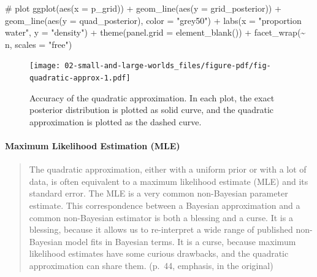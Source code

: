 \documentclass[
  letterpaper,
  DIV=11,
  numbers=noendperiod]{scrreprt}
\let\oldparagraph\paragraph
\renewcommand{\paragraph}[1]{\oldparagraph{#1}\mbox{}}
\newenvironment{Shaded}{\begin{snugshade}}{\end{snugshade}}
\newcommand{\AttributeTok}[1]{\textcolor[rgb]{0.40,0.45,0.13}{#1}}
\newcommand{\CommentTok}[1]{\textcolor[rgb]{0.37,0.37,0.37}{#1}}
\newcommand{\FunctionTok}[1]{\textcolor[rgb]{0.28,0.35,0.67}{#1}}
\newcommand{\InformationTok}[1]{\textcolor[rgb]{0.37,0.37,0.37}{#1}}
\newcommand{\NormalTok}[1]{\textcolor[rgb]{0.00,0.23,0.31}{#1}}
\newcommand{\SpecialCharTok}[1]{\textcolor[rgb]{0.37,0.37,0.37}{#1}}
\newcommand{\StringTok}[1]{\textcolor[rgb]{0.13,0.47,0.30}{#1}}
\begin{document}
\begin{codelisting}
\begin{Shaded}
\begin{Highlighting}[]
  \CommentTok{\# plot}
  \FunctionTok{ggplot}\NormalTok{(}\FunctionTok{aes}\NormalTok{(}\AttributeTok{x =}\NormalTok{ p\_grid)) }\SpecialCharTok{+}
  \FunctionTok{geom\_line}\NormalTok{(}\FunctionTok{aes}\NormalTok{(}\AttributeTok{y =}\NormalTok{ grid\_posterior)) }\SpecialCharTok{+}
  \FunctionTok{geom\_line}\NormalTok{(}\FunctionTok{aes}\NormalTok{(}\AttributeTok{y =}\NormalTok{ quad\_posterior),}
            \AttributeTok{color =} \StringTok{"grey50"}\NormalTok{) }\SpecialCharTok{+}
  \FunctionTok{labs}\NormalTok{(}\AttributeTok{x =} \StringTok{"proportion water"}\NormalTok{,}
       \AttributeTok{y =} \StringTok{"density"}\NormalTok{) }\SpecialCharTok{+}
  \FunctionTok{theme}\NormalTok{(}\AttributeTok{panel.grid =} \FunctionTok{element\_blank}\NormalTok{()) }\SpecialCharTok{+}
  \FunctionTok{facet\_wrap}\NormalTok{(}\SpecialCharTok{\textasciitilde{}}\NormalTok{ n, }\AttributeTok{scales =} \StringTok{"free"}\NormalTok{)}
\InformationTok{\textasciigrave{}\textasciigrave{}\textasciigrave{}}
\end{Highlighting}
\end{Shaded}

\end{codelisting}

\begin{figure}[H]

{\centering \texttt{[image: 02-small-and-large-worlds\_files/figure-pdf/fig-quadratic-approx-1.pdf]}

}

\caption{\label{fig-quadratic-approx}Accuracy of the quadratic
approximation. In each plot, the exact posterior distribution is plotted
as solid curve, and the quadratic approximation is plotted as the dashed
curve.}

\end{figure}

\hypertarget{maximum-likelihood-estimation-mle}{%
\paragraph{Maximum Likelihood Estimation
(MLE)}\label{maximum-likelihood-estimation-mle}}

\begin{quote}
The quadratic approximation, either with a uniform prior or with a lot
of data, is often equivalent to a maximum likelihood estimate (MLE) and
its standard error. The MLE is a very common non-Bayesian parameter
estimate. This correspondence between a Bayesian approximation and a
common non-Bayesian estimator is both a blessing and a curse. It is a
blessing, because it allows us to re-interpret a wide range of published
non-Bayesian model fits in Bayesian terms. It is a curse, because
maximum likelihood estimates have some curious drawbacks, and the
quadratic approximation can share them. (p.~44, emphasis, in the
original)
\end{quote}
\end{document}
